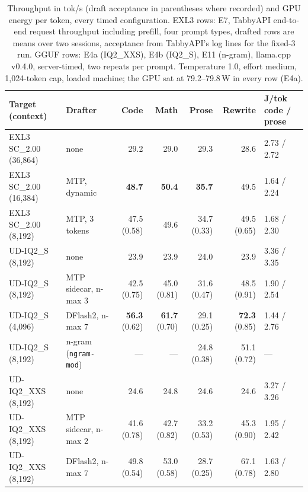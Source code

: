 \documentclass[11pt]{article}
\newcommand{\q}[1]{\texttt{#1}}
\begin{document}
\begin{table}[htbp]
\centering
\scriptsize
\setlength{\tabcolsep}{3.5pt}
\begin{tabular}{llrrrrl}
\toprule
Target (context) & Drafter & Code & Math & Prose & Rewrite & J/tok code / prose \\
\midrule
EXL3 SC\_2.00 (36,864) & none & 29.2 & 29.0 & 29.3 & 28.6 & 2.73 / 2.72 \\
EXL3 SC\_2.00 (16,384) & MTP, dynamic & \textbf{48.7} & \textbf{50.4} & \textbf{35.7} & 49.5 & 1.64 / 2.24 \\
EXL3 SC\_2.00 (8,192) & MTP, 3 tokens & 47.5 (0.58) & 49.6 & 34.7 (0.33) & 49.5 (0.65) & 1.68 / 2.30 \\
\addlinespace
UD-IQ2\_S (8,192) & none & 23.9 & 23.9 & 24.0 & 23.9 & 3.36 / 3.35 \\
UD-IQ2\_S (8,192) & MTP sidecar, n-max 3 & 42.5 (0.75) & 45.0 (0.81) & 31.6 (0.47) & 48.5 (0.91) & 1.90 / 2.54 \\
UD-IQ2\_S (4,096) & DFlash2, n-max 7 & \textbf{56.3} (0.62) & \textbf{61.7} (0.70) & 29.1 (0.25) & \textbf{72.3} (0.85) & 1.44 / 2.76 \\
UD-IQ2\_S (8,192) & n-gram (\q{ngram-mod}) & --- & --- & 24.8 (0.38) & 51.1 (0.72) & --- \\
\addlinespace
UD-IQ2\_XXS (8,192) & none & 24.6 & 24.8 & 24.6 & 24.6 & 3.27 / 3.26 \\
UD-IQ2\_XXS (8,192) & MTP sidecar, n-max 2 & 41.6 (0.78) & 42.7 (0.82) & 33.2 (0.53) & 45.3 (0.90) & 1.95 / 2.42 \\
UD-IQ2\_XXS (8,192) & DFlash2, n-max 7 & 49.8 (0.54) & 53.0 (0.58) & 28.7 (0.25) & 67.1 (0.78) & 1.63 / 2.80 \\
\bottomrule
\end{tabular}
\caption{Throughput in tok/s (draft acceptance in parentheses where
recorded) and GPU energy per token, every timed configuration. EXL3 rows:
E7, TabbyAPI end-to-end request throughput including prefill, four prompt types, drafted rows are means over two
sessions, acceptance from TabbyAPI's log lines for the fixed-3 run. GGUF
rows: E4a (IQ2\_XXS), E4b (IQ2\_S), E11 (n-gram), llama.cpp v0.4.0,
server-timed, two repeats per prompt. Temperature 1.0, effort medium,
1,024-token cap, loaded machine; the GPU sat at 79.2--79.8\,W in every row
(E4a).}
\label{tab:throughput}
\end{table}
\end{document}
